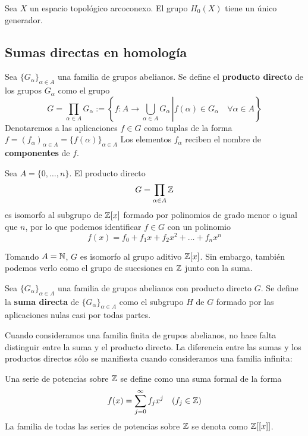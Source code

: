 \begin{proposition}
Sea $X$ un espacio topológico arcoconexo. El grupo $H_0(X)$ tiene un único
generador.
\end{proposition}

\subsection{Sumas directas en homología}
Sea $\{G_\alpha\}_{\alpha \in A}$ una familia de grupos abelianos. Se define el
\textbf{producto directo} de los grupos $G_\alpha$ como el grupo
\[G=
\prod_{\alpha \in A} G_\alpha:=
\left\{\left.f\colon A \to \bigcup_{\alpha \in A}G_\alpha\,\right|
f(\alpha) \in G_\alpha \quad \forall \alpha \in A\right\}\]
Denotaremos a las aplicaciones $f \in G$ como tuplas de la forma
$f=(f_\alpha)_{\alpha \in A}=\{f(\alpha)\}_{\alpha \in A}$ Los elementos
$f_\alpha$ reciben el nombre de \textbf{componentes} de $f$.

\begin{example}
Sea $A=\{0,\dots, n\}$. El producto directo
\[G=\prod_{\alpha \in A}\mathbb{Z}\]
es isomorfo al subgrupo de $\mathbb{Z}[x]$ formado por polinomios de grado menor
o igual que $n$, por lo que podemos identificar $f \in G$ con un polinomio
\[f(x)=f_0+f_1x+f_2x^2+\dots+f_nx^{n}\]

Tomando $A=\mathbb{N}$, $G$ es isomorfo al grupo aditivo $\mathbb{Z}[x]$. Sin embargo,
también podemos verlo como el grupo de sucesiones en $\mathbb{Z}$ junto con la suma.
\end{example}

\begin{definition}
Sea $\{G_\alpha\}_{\alpha \in A}$ una familia de grupos abelianos con producto
directo $G$. Se define la \textbf{suma directa} de $\{G_\alpha\}_{\alpha \in A}$
como el subgrupo $H$ de $G$ formado por las aplicaciones nulas casi por todas
partes.
\end{definition}

Cuando consideramos una familia finita de grupos abelianos, no hace falta
distinguir entre la suma y el producto directo. La diferencia entre las sumas y
los productos directos sólo se manifiesta cuando consideramos una familia
infinita:

Una serie de potencias sobre $\mathbb{Z}$ se define como una suma formal de la forma
\begin{equation}
f(x)=\sum^\infty_{j=0}f_jx^j \quad (f_j \in \mathbb{Z}) \label{SeriePotencias}
\end{equation}
La familia de todas las series de potencias sobre $\mathbb{Z}$ se denota como
$\mathbb{Z}[[x]]$.

